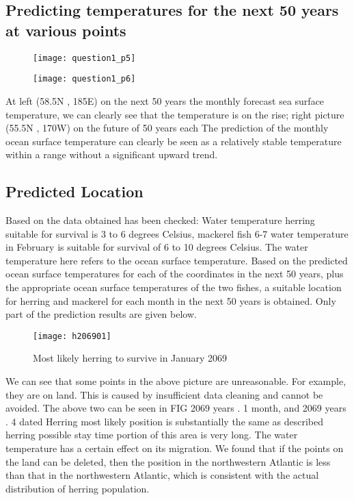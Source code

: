 \documentclass{mcmthesis}
\begin{document}
\subsection{Predicting temperatures for the next 50 years at various points}
\begin{figure}[h]
	\small
	\centering
	\texttt{[image: question1\_p5]}
	\label{fig:aa}
\end{figure}

\begin{figure}[h]
	\small
	\centering
	\texttt{[image: question1\_p6]}
	\label{fig:aa}
\end{figure}

At left (58.5N , 185E) on the next 50 years the monthly forecast sea surface temperature, we can clearly see that the temperature is on the rise; right picture (55.5N , 170W) on the future of 50 years each The prediction of the monthly ocean surface temperature can clearly be seen as a relatively stable temperature within a range without a significant upward trend.

\subsection{Predicted Location}
Based on the data obtained has been checked: Water temperature herring suitable for survival is 3 to 6 degrees Celsius, mackerel fish 6-7 water temperature in February is suitable for survival of 6 to 10 degrees Celsius. The water temperature here refers to the ocean surface temperature. Based on the predicted ocean surface temperatures for each of the coordinates in the next 50 years, plus the appropriate ocean surface temperatures of the two fishes, a suitable location for herring and mackerel for each month in the next 50 years is obtained. Only part of the prediction results are given below.
\begin{figure}[h]
	\small
	\centering
	\texttt{[image: h206901]}
	\caption{Most likely herring to survive in January 2069} \label{fig:aa}
\end{figure}

We can see that some points in the above picture are unreasonable. For example, they are on land. This is caused by insufficient data cleaning and cannot be avoided. The above two can be seen in FIG 2069 years . 1 month, and 2069 years . 4 dated Herring most likely position is substantially the same as described herring possible stay time portion of this area is very long. The water temperature has a certain effect on its migration. We found that if the points on the land can be deleted, then the position in the northwestern Atlantic is less than that in the northwestern Atlantic, which is consistent with the actual distribution of herring population.
\end{document}
